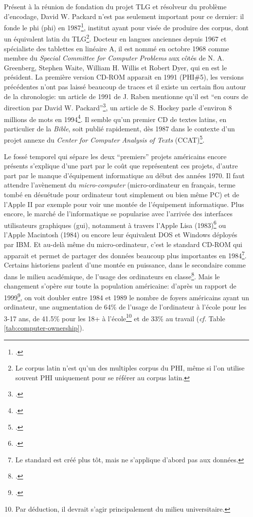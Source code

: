 Présent à la réunion de fondation du projet TLG et résolveur du problème d'encodage, David W. Packard n'est pas seulement important pour ce dernier: il fonde le \acrfull{phi} (\acrshort{phi}) en 1987\footcite{helgerson_cd-rom_1988}, institut ayant pour visée de produire des corpus, dont un équivalent latin du TLG\footnote{Le corpus latin n'est qu'un des multiples corpus du PHI, même si l'on utilise souvent PHI uniquement pour se référer au corpus latin.}. Docteur en langues anciennes depuis 1967 et spécialiste des tablettes en linéaire A, il est nommé en octobre 1968 comme membre du \textit{Special Committee for Computer Problems} aux côtés de N. A. Greenberg, Stephen Waite, William H. Willis et Robert Dyer, qui en est le président. La première version CD-ROM apparait en 1991 (PHI\#5), les versions précédentes n'ont pas laissé beaucoup de traces et il existe un certain flou autour de la chronologie: un article de 1991 de J. Raben mentionne qu'il est \enquote{en cours de direction par David W. Packard}\footcite{raben_humanities_1991}, un article de S. Hockey parle d'environ 8 millions de mots en 1994\footcite{hockey_electronic_1994}. Il semble qu'un premier CD de textes latins, en particulier de la \textit{Bible}, soit publié rapidement, dès 1987 dans le contexte d'un projet annexe du \textit{Center for Computer Analysis of Texts} (CCAT)\footcite{groves_tovs_1990, cornell_greek_1989}.

Le fossé temporel qui sépare les deux \enquote{premiers} projets américains encore présents s'explique d'une part par le coût que représentent ces projets, d'autre part par le manque d'équipement informatique au début des années 1970. Il faut attendre l'avènement du \textit{micro-computer} (micro-ordinateur en français, terme tombé en désuétude pour ordinateur tout simplement ou bien même PC) et de l'Apple II par exemple pour voir une montée de l'équipement informatique. Plus encore, le marché de l'informatique se popularise avec l'arrivée des interfaces utilisateurs graphiques (\acrshort{gui}), notamment à travers l'Apple Lisa (1983)\footcite{noauthor_history_2021} ou l'Apple Macintosh (1984) ou encore leur équivalent DOS et Windows déployés par IBM. Et au-delà même du micro-ordinateur, c'est le standard CD-ROM qui apparait et permet de partager des données beaucoup plus importantes en 1984\footnote{Le standard est créé plus tôt, mais ne s'applique d'abord pas aux données.}. Certains historiens parlent d'une montée en puissance, dans le secondaire comme dans le milieu académique, de l'usage des ordinateurs en classe\footcite{simkin_introduction_1989, latousek_fifty_2001}. Mais le changement s'opère sur toute la population américaine: d'après un rapport de 1999\footcite{kominski1999access}, on voit doubler  entre 1984 et 1989 le nombre de foyers américains ayant un ordinateur, une augmentation de 64\% de l'usage de l'ordinateur à l'école pour les 3-17 ans, de 41.5\% pour les 18+ à l'école\footnote{Par déduction, il devrait s'agir principalement du milieu universitaire.} et de 33\% au travail (\textit{cf.} Table \ref{tab:computer-ownership}).

